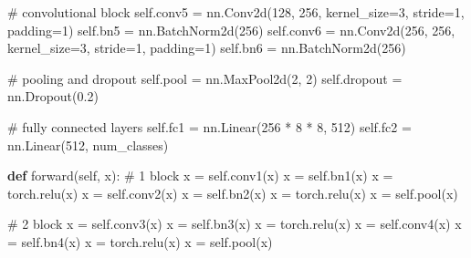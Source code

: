 \documentclass[
  letterpaper,
  DIV=11,
  numbers=noendperiod]{scrartcl}
\newenvironment{Shaded}{\begin{snugshade}}{\end{snugshade}}
\newcommand{\CommentTok}[1]{\textcolor[rgb]{0.37,0.37,0.37}{#1}}
\newcommand{\DecValTok}[1]{\textcolor[rgb]{0.68,0.00,0.00}{#1}}
\newcommand{\FloatTok}[1]{\textcolor[rgb]{0.68,0.00,0.00}{#1}}
\newcommand{\KeywordTok}[1]{\textcolor[rgb]{0.00,0.23,0.31}{\textbf{#1}}}
\newcommand{\NormalTok}[1]{\textcolor[rgb]{0.00,0.23,0.31}{#1}}
\newcommand{\OperatorTok}[1]{\textcolor[rgb]{0.37,0.37,0.37}{#1}}
\newcommand{\VariableTok}[1]{\textcolor[rgb]{0.07,0.07,0.07}{#1}}
\begin{document}
\begin{Shaded}
\begin{Highlighting}[]
        \CommentTok{\# convolutional block}
        \VariableTok{self}\NormalTok{.conv5 }\OperatorTok{=}\NormalTok{ nn.Conv2d(}\DecValTok{128}\NormalTok{, }\DecValTok{256}\NormalTok{, kernel\_size}\OperatorTok{=}\DecValTok{3}\NormalTok{, stride}\OperatorTok{=}\DecValTok{1}\NormalTok{, padding}\OperatorTok{=}\DecValTok{1}\NormalTok{)}
        \VariableTok{self}\NormalTok{.bn5 }\OperatorTok{=}\NormalTok{ nn.BatchNorm2d(}\DecValTok{256}\NormalTok{)}
        \VariableTok{self}\NormalTok{.conv6 }\OperatorTok{=}\NormalTok{ nn.Conv2d(}\DecValTok{256}\NormalTok{, }\DecValTok{256}\NormalTok{, kernel\_size}\OperatorTok{=}\DecValTok{3}\NormalTok{, stride}\OperatorTok{=}\DecValTok{1}\NormalTok{, padding}\OperatorTok{=}\DecValTok{1}\NormalTok{)}
        \VariableTok{self}\NormalTok{.bn6 }\OperatorTok{=}\NormalTok{ nn.BatchNorm2d(}\DecValTok{256}\NormalTok{)}

        \CommentTok{\# pooling and dropout}
        \VariableTok{self}\NormalTok{.pool }\OperatorTok{=}\NormalTok{ nn.MaxPool2d(}\DecValTok{2}\NormalTok{, }\DecValTok{2}\NormalTok{)}
        \VariableTok{self}\NormalTok{.dropout }\OperatorTok{=}\NormalTok{ nn.Dropout(}\FloatTok{0.2}\NormalTok{)}

        \CommentTok{\# fully connected layers}
        \VariableTok{self}\NormalTok{.fc1 }\OperatorTok{=}\NormalTok{ nn.Linear(}\DecValTok{256} \OperatorTok{*} \DecValTok{8} \OperatorTok{*} \DecValTok{8}\NormalTok{, }\DecValTok{512}\NormalTok{)}
        \VariableTok{self}\NormalTok{.fc2 }\OperatorTok{=}\NormalTok{ nn.Linear(}\DecValTok{512}\NormalTok{, num\_classes)}

    \KeywordTok{def}\NormalTok{ forward(}\VariableTok{self}\NormalTok{, x):}
        \CommentTok{\# 1 block}
\NormalTok{        x }\OperatorTok{=} \VariableTok{self}\NormalTok{.conv1(x)}
\NormalTok{        x }\OperatorTok{=} \VariableTok{self}\NormalTok{.bn1(x)}
\NormalTok{        x }\OperatorTok{=}\NormalTok{ torch.relu(x)}
\NormalTok{        x }\OperatorTok{=} \VariableTok{self}\NormalTok{.conv2(x)}
\NormalTok{        x }\OperatorTok{=} \VariableTok{self}\NormalTok{.bn2(x)}
\NormalTok{        x }\OperatorTok{=}\NormalTok{ torch.relu(x)}
\NormalTok{        x }\OperatorTok{=} \VariableTok{self}\NormalTok{.pool(x)}

        \CommentTok{\# 2 block}
\NormalTok{        x }\OperatorTok{=} \VariableTok{self}\NormalTok{.conv3(x)}
\NormalTok{        x }\OperatorTok{=} \VariableTok{self}\NormalTok{.bn3(x)}
\NormalTok{        x }\OperatorTok{=}\NormalTok{ torch.relu(x)}
\NormalTok{        x }\OperatorTok{=} \VariableTok{self}\NormalTok{.conv4(x)}
\NormalTok{        x }\OperatorTok{=} \VariableTok{self}\NormalTok{.bn4(x)}
\NormalTok{        x }\OperatorTok{=}\NormalTok{ torch.relu(x)}
\NormalTok{        x }\OperatorTok{=} \VariableTok{self}\NormalTok{.pool(x)}


\end{Highlighting}
\end{Shaded}
\end{document}
